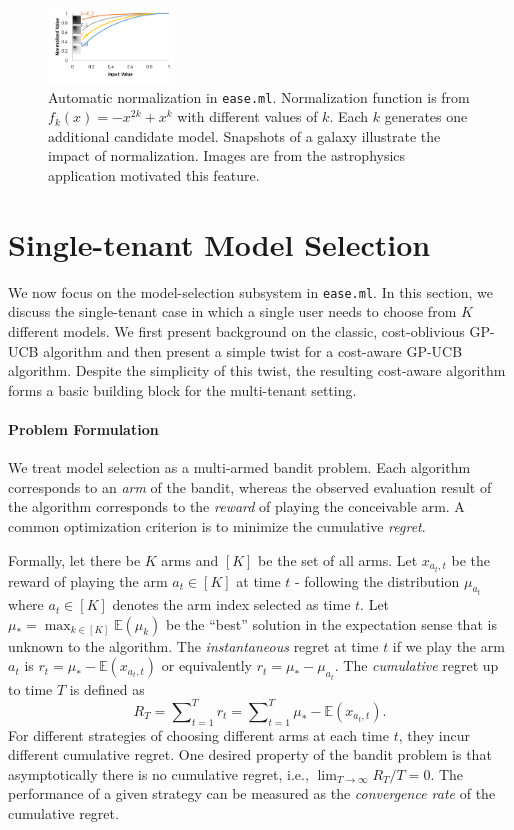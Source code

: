 \documentclass[letterpaper]{vldb}
\newcommand{\eml}{\texttt{ease.ml}\xspace}
\newcommand{\E}{\mathbb{E}}
\begin{document}
\begin{figure}[t]
\centering
\includegraphics[width=0.3\textwidth]{figures/normalize}
\vspace{-2em}
\caption{Automatic normalization in \eml. Normalization function
is from $f_k(x) = -x^{2k} + x^{k}$ with different 
values of $k$. Each $k$ generates one additional candidate
model. Snapshots of a galaxy illustrate the impact of
normalization. Images are from the astrophysics 
application motivated this feature.}
 \label{fig:normalization}
\end{figure}



\section{Single-tenant Model Selection} \label{sec:singletenant}

We now focus on the model-selection subsystem in \eml. In this section,
we discuss the single-tenant case in which a single user needs to
choose from $K$ different models. We first present background on
the classic, cost-oblivious GP-UCB algorithm and then present a simple
twist for a cost-aware GP-UCB algorithm. Despite the simplicity of
this twist, the resulting cost-aware algorithm forms a basic building
block for the multi-tenant setting.

\vspace{-1em}
\paragraph*{Problem Formulation} We treat
model selection as a multi-armed bandit problem.
Each algorithm corresponds to an \emph{arm} of 
the bandit, whereas the observed evaluation result of 
the algorithm corresponds to the \emph{reward} of playing the conceivable arm.
A common optimization criterion is to minimize the cumulative
\emph{regret}.


Formally, let there be $K$ arms and $[K]$ be the set of
all arms. Let $x_{a_t, t}$ be the reward of playing the arm $a_t\in[K]$
at time $t$ - following the distribution $\mu_{a_t}$ where $a_t \in [K]$ denotes the arm index selected as time $t$. Let $\mu_*=\max_{k\in[K]}\mathbb{E}(\mu_k)$ be the ``best'' solution in the expectation sense that is unknown to the algorithm.
The {\em instantaneous} regret at time $t$ if we
play the arm $a_t$ is $r_t=\mu_*-\E(x_{a_t, t})$ or equivalently $r_t = \mu_*-\mu_{a_t}$.
The {\em cumulative} regret up to time $T$ is defined as
\[
R_{T}=\sum\nolimits_{t=1}^{T}r_t = \sum\nolimits_{t=1}^{T} \mu_*-\E(x_{a_t, t}) .
\]
For different strategies of choosing different arms at
each time $t$, they incur different cumulative regret.
One desired property of the bandit problem is 
that asymptotically there is no cumulative regret, i.e.,
$\lim\nolimits_{T\to\infty}R_T/T=0.$ The performance
of a given strategy can be measured as the {\em convergence rate}
of the cumulative regret.
\end{document}
